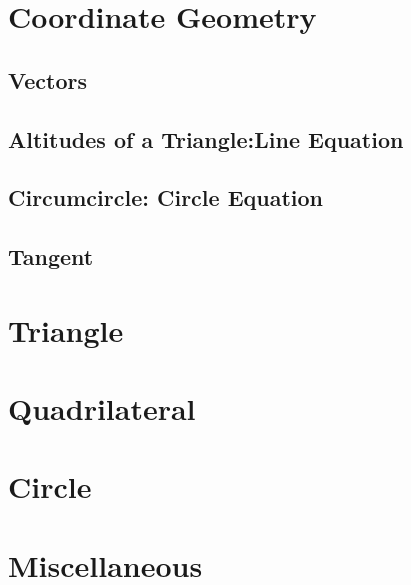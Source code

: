 \documentclass[11pt]{book}
\begin{document}
\chapter{Coordinate Geometry}
\section{Vectors}

\section{Altitudes of a Triangle:Line Equation}

\section{Circumcircle: Circle Equation}

\section{Tangent}

\chapter{Triangle}

\chapter{Quadrilateral}

%
\chapter{Circle}

\chapter{Miscellaneous }

\iffalse
% 
\backmatter
\appendix
\chapter{Area of a Circle}

\fi
%
%

%
%
%
\latexprintindex
\end{document}
